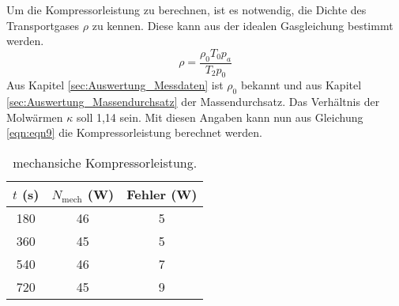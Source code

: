 Um die Kompressorleistung zu berechnen, ist es notwendig, die Dichte des Transportgases $\rho$ zu kennen.
Diese kann aus der idealen Gasgleichung bestimmt werden.
\begin{equation*}
 \rho = \frac{\rho_0 T_0 p_a}{T_2 p_0}
\end{equation*}
Aus Kapitel \ref{sec:Auswertung_Messdaten} ist $\rho_0$ bekannt und aus Kapitel \ref{sec:Auswertung_Massendurchsatz} der Massendurchsatz.
Das Verhältnis der Molwärmen $\kappa$ soll 1,14 sein.
Mit diesen Angaben kann nun aus Gleichung \eqref{eqn:eqn9} die Kompressorleistung berechnet werden.
\begin{table}
  \centering
  \caption{mechansiche Kompressorleistung.}
  \label{tab:Leistung}
  \begin{tabular}{c c c}
    \toprule
    $t$ (s) & $N_{\text{mech}}$ (W) & Fehler (W) \\
    \midrule
    180 & 46 & 5 \\
    360 & 45 & 5 \\
    540 & 46 & 7 \\
    720 & 45 & 9 \\
    \bottomrule
  \end{tabular}
\end{table}
